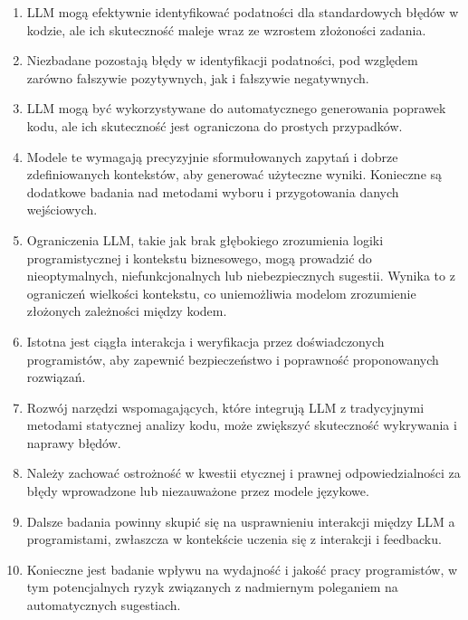 \begin{enumerate}
    \item LLM mogą efektywnie identyfikować podatności dla standardowych błędów w kodzie, ale ich skuteczność maleje wraz ze wzrostem złożoności zadania.
    \item Niezbadane pozostają błędy w identyfikacji podatności, pod względem zarówno fałszywie pozytywnych, jak i fałszywie negatywnych.
    \item LLM mogą być wykorzystywane do automatycznego generowania poprawek kodu, ale ich skuteczność jest ograniczona do prostych przypadków.
    \item Modele te wymagają precyzyjnie sformułowanych zapytań i dobrze zdefiniowanych kontekstów, aby generować użyteczne wyniki. Konieczne są dodatkowe badania nad metodami wyboru i przygotowania danych wejściowych.
    \item Ograniczenia LLM, takie jak brak głębokiego zrozumienia logiki programistycznej i kontekstu biznesowego, mogą prowadzić do nieoptymalnych, niefunkcjonalnych lub niebezpiecznych sugestii. Wynika to z ograniczeń wielkości kontekstu, co uniemożliwia modelom zrozumienie złożonych zależności między kodem.
    \item Istotna jest ciągła interakcja i weryfikacja przez doświadczonych programistów, aby zapewnić bezpieczeństwo i poprawność proponowanych rozwiązań.
    \item Rozwój narzędzi wspomagających, które integrują LLM z tradycyjnymi metodami statycznej analizy kodu, może zwiększyć skuteczność wykrywania i naprawy błędów.
    \item Należy zachować ostrożność w kwestii etycznej i prawnej odpowiedzialności za błędy wprowadzone lub niezauważone przez modele językowe.
    \item Dalsze badania powinny skupić się na usprawnieniu interakcji między LLM a programistami, zwłaszcza w kontekście uczenia się z interakcji i feedbacku.
    \item Konieczne jest badanie wpływu na wydajność i jakość pracy programistów, w tym potencjalnych ryzyk związanych z nadmiernym poleganiem na automatycznych sugestiach.
\end{enumerate}
